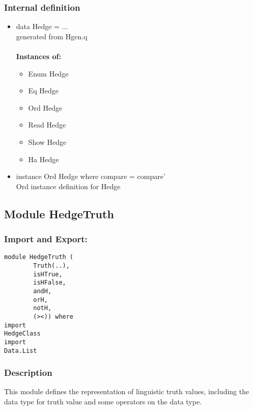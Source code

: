 \documentclass[../gr-final.tex]{subfiles}
\begin{document}
\subsubsection{Internal definition}
\begin{itemize}
        \item data Hedge = ... \\
                generated from Hgen.q\\\\
                {\bfseries Instances of: }
         \begin{itemize}
                 \item Enum Hedge 
                 \item Eq Hedge 
                 \item Ord Hedge
                 \item Read Hedge 
                 \item Show Hedge 
                 \item Ha Hedge
        \end{itemize}
        \item instance Ord Hedge where compare = compare'\\
                Ord instance definition for Hedge                
\end{itemize}

\subsection{Module HedgeTruth}
\subsubsection{Import and Export:}
\begin{lstlisting}
module HedgeTruth (
        Truth(..),
        isHTrue,
        isHFalse,
        andH,
        orH,
        notH,
        (><)) where
import
HedgeClass
import
Data.List
\end{lstlisting}
\subsubsection{Description}
This module defines the representation of linguistic truth
values, including the data type for truth value and some
operators on the data type.
\end{document}
